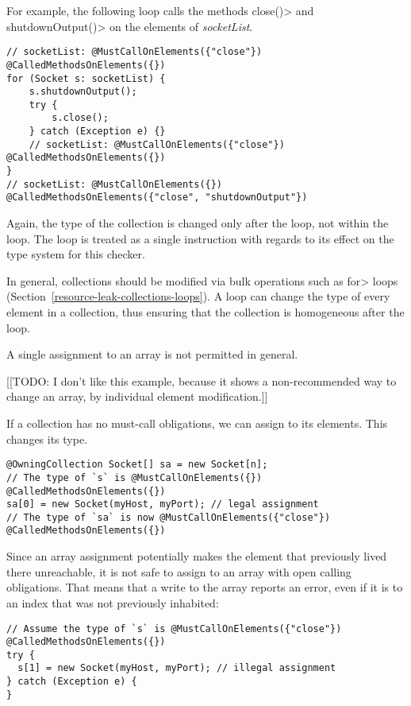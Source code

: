 For example, the following loop calls the methods \<close()> and \<shutdownOutput()> on the elements of \textit{socketList}.

\begin{verbatim}
// socketList: @MustCallOnElements({"close"}) @CalledMethodsOnElements({})
for (Socket s: socketList) {
    s.shutdownOutput();
    try {
        s.close();
    } catch (Exception e) {}
    // socketList: @MustCallOnElements({"close"}) @CalledMethodsOnElements({})
}
// socketList: @MustCallOnElements({}) @CalledMethodsOnElements({"close", "shutdownOutput"})
\end{verbatim}

Again, the type of the collection is changed only after the loop, not within the
loop. The loop is treated as a single instruction with regards to its effect on
the type system for this checker.



In general, collections should be modified via bulk operations such as
\<for> loops (Section~\ref{resource-leak-collections-loops}).  A loop can
change the type of every element in a collection, thus ensuring that the
collection is homogeneous after the loop.

A single assignment to an array is not permitted in general.



[[TODO: I don't like this example, because it shows a non-recommended way
to change an array, by individual element modification.]]

If a collection has no must-call obligations, we can assign to its
elements. This changes its type.

\begin{verbatim}
@OwningCollection Socket[] sa = new Socket[n];
// The type of `s` is @MustCallOnElements({}) @CalledMethodsOnElements({})
sa[0] = new Socket(myHost, myPort); // legal assignment
// The type of `sa` is now @MustCallOnElements({"close"}) @CalledMethodsOnElements({})
\end{verbatim}

Since an array assignment potentially makes the element that previously lived there unreachable, it is not safe to assign to an array with open calling obligations. That means that a write to the array reports an error, even if it is to an index that was not previously inhabited:

\begin{verbatim}
// Assume the type of `s` is @MustCallOnElements({"close"}) @CalledMethodsOnElements({})
try {
  s[1] = new Socket(myHost, myPort); // illegal assignment
} catch (Exception e) {
}
\end{verbatim}

